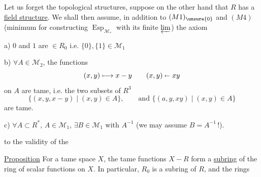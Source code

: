 Let us forget the topological structures, suppose on the other hand that $R$ has a \uline{field structure}. We shall then assume,  in addition to $(M1)_{\unsure{0}}$ and $(M4)$ (minimum for constructing $\operatorname{Esp}_{\mathcal M_*}$ with its finite $\varprojlim$) the axiom


a) $0$ and $1$ are $\in R_0$ i.e. $\{0\},\{1\}\in\mathcal M_1$

b) $\forall A\in\mathcal M_2$, the functions
\[
 (x,y)\longmapsto x-y\qquad
 (x,y)\mathrel{\mapstochar\relbar}xy
\]
on $A$ are tame,  i.e. the two subsets of $R^3$
\[
 \{(x,y,x-y)\mid(x,y)\in A\},\qquad\text{and }\{(a,y,xy)\mid(x,y)\in A\}
\]
are tame.

c) $\forall A\subset R^*$, $A\in\mathcal M_1$, $\exists B\in\mathcal M_1$ with $A^{-1}$  (we may assume $B=A^{-1}$\,!).

    to the validity of the


\uline{Proposition} For a tame space $X$, the tame functions $X\mathbin{-}R$  form a \uline{subring} of the ring of scalar functions on $X$. In particular, $R_0$ is a subring of $R$, and the rings
